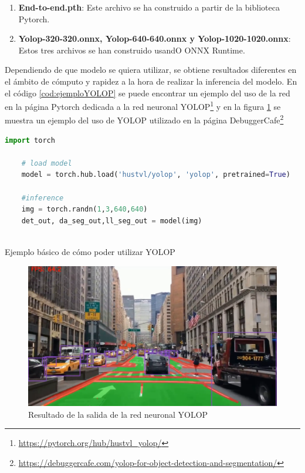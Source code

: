 \begin{enumerate}
  \item \textbf{End-to-end.pth}: Este archivo se ha construido a partir de la biblioteca Pytorch. 
  \item \textbf{Yolop-320-320.onnx, Yolop-640-640.onnx y Yolop-1020-1020.onnx}: Estos tres archivos se han construido usandO ONNX Runtime.
\end{enumerate}

Dependiendo de que modelo se quiera utilizar, se obtiene resultados diferentes en el ámbito de cómputo y rapidez a la hora de 
realizar la inferencia del modelo. En el código \ref{cod:ejemploYOLOP} se puede encontrar un ejemplo del uso de la red en la página Pytorch dedicada a la red neuronal YOLOP\footnote{\url{https://pytorch.org/hub/hustvl_yolop/}}
y en la figura \ref{f:resultadosYOLOP} se muestra un ejemplo del uso de YOLOP utilizado en la página DebuggerCafe\footnote{\url{https://debuggercafe.com/yolop-for-object-detection-and-segmentation/}}

\begin{code}[h]
  \begin{lstlisting}[language=Python]
    import torch

    # load model
    model = torch.hub.load('hustvl/yolop', 'yolop', pretrained=True)
    
    #inference
    img = torch.randn(1,3,640,640)
    det_out, da_seg_out,ll_seg_out = model(img)
    
  \end{lstlisting}
  \caption[Cargar modelo YOLOP con pesos preentrenados End-to-end.pth]{Ejemplo básico de cómo poder utilizar YOLOP}
  \label{cod:ejemploYOLOP}
  \end{code}  

  \begin{figure}[H]
    \centering
    \begin{minipage}{0.6\textwidth}
      \includegraphics[width=\linewidth]{figs/Plataformas_Desarollo/YOLOP1.png}
    \end{minipage}
    \caption{Resultado de la salida de la red neuronal YOLOP}
    \label{f:resultadosYOLOP}
    \vspace{-1.5em}
  \end{figure}

